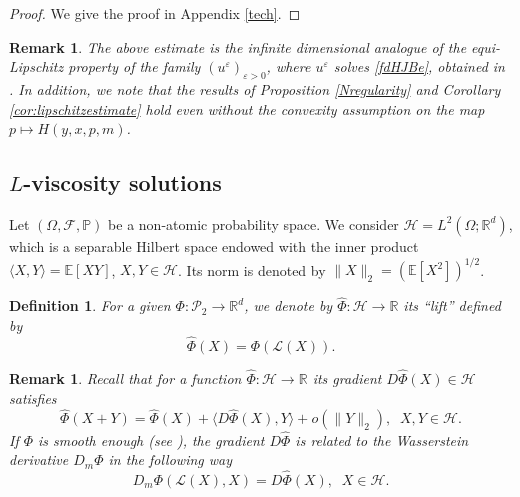 \documentclass[reqno,11pt]{amsart}
\newtheorem{definition}[theorem]{Definition}
\newtheorem{remark}[theorem]{Remark}
\numberwithin{equation}{section}
\newcommand{\R}{\mathbb{R}} %
\newcommand{\e}{\varepsilon}
\renewcommand{\hat}{\widehat}
\begin{document}
\begin{proof}
    We give the proof in Appendix \ref{tech}.
\end{proof}


\begin{remark}
    The above estimate is the infinite dimensional analogue of the equi-Lipschitz property of the family $(u^\e)_{\e>0}$, where $u^\e$ solves \eqref{fdHJBe}, obtained in \cite{LionsPapaVara1987}. In addition, we note that the results of Proposition \ref{Nregularity} and Corollary \ref{cor:lipschitzestimate} hold even without the convexity assumption on the map $p\mapsto H(y,x,p,m)$.
\end{remark}




\subsection{$L$-viscosity solutions} Let $(\Omega,\mathcal{F},\mathbb{P})$ be a non-atomic probability space. We consider $\mathcal{H}=L^2(\Omega;\R^d)$, which is a separable Hilbert space endowed with the inner product $\langle X,Y \rangle=\mathbb{E}[XY]$, $X,Y\in\mathcal{H}$. Its norm is denoted by $\|X\|_2=\left(\mathbb{E}[X^2]\right)^{1/2}$.

\begin{definition}
    For a given $\Phi:\mathcal{P}_2\rightarrow \R^d$, we denote by $\hat{\Phi}:\mathcal{H}\rightarrow \R$ its ``lift'' defined by
    $$\hat{\Phi}(X)=\Phi(\mathcal{L}(X)).$$
\end{definition}

\begin{remark}
Recall that for a function $\hat{\Phi}:\mathcal{H}\rightarrow \R$ its gradient $D \hat{\Phi}(X)\in \mathcal{H}$ satisfies
$$\hat{\Phi}(X+Y)=\hat{\Phi}(X)+\langle D\hat{\Phi}(X), Y\rangle+o(\|Y\|_2),\;\; X,Y\in\mathcal{H}.$$
If $\Phi$ is smooth enough (see \cite{carmona2018probabilistic}), the gradient $D\hat{\Phi}$ is related to the Wasserstein derivative $D_m\Phi$ in the following way
$$D_m\Phi(\mathcal{L}(X),X)=D\hat{\Phi}(X),\;\; X\in\mathcal{H}.$$
\end{remark}
\vspace{1mm}
\end{document}
